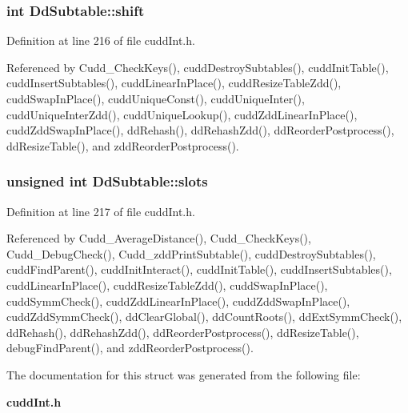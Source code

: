 \subsubsection{\setlength{\rightskip}{0pt plus 5cm}int \bf{Dd\-Subtable::shift}}\label{structDdSubtable_e89bb40a595ce1eda70d63fd78b23865}




Definition at line 216 of file cudd\-Int.h.

Referenced by Cudd\_\-Check\-Keys(), cudd\-Destroy\-Subtables(), cudd\-Init\-Table(), cudd\-Insert\-Subtables(), cudd\-Linear\-In\-Place(), cudd\-Resize\-Table\-Zdd(), cudd\-Swap\-In\-Place(), cudd\-Unique\-Const(), cudd\-Unique\-Inter(), cudd\-Unique\-Inter\-Zdd(), cudd\-Unique\-Lookup(), cudd\-Zdd\-Linear\-In\-Place(), cudd\-Zdd\-Swap\-In\-Place(), dd\-Rehash(), dd\-Rehash\-Zdd(), dd\-Reorder\-Postprocess(), dd\-Resize\-Table(), and zdd\-Reorder\-Postprocess().
\subsubsection{\setlength{\rightskip}{0pt plus 5cm}unsigned int \bf{Dd\-Subtable::slots}}\label{structDdSubtable_b01ae39304c9a7ce2236584a78ff5856}




Definition at line 217 of file cudd\-Int.h.

Referenced by Cudd\_\-Average\-Distance(), Cudd\_\-Check\-Keys(), Cudd\_\-Debug\-Check(), Cudd\_\-zdd\-Print\-Subtable(), cudd\-Destroy\-Subtables(), cudd\-Find\-Parent(), cudd\-Init\-Interact(), cudd\-Init\-Table(), cudd\-Insert\-Subtables(), cudd\-Linear\-In\-Place(), cudd\-Resize\-Table\-Zdd(), cudd\-Swap\-In\-Place(), cudd\-Symm\-Check(), cudd\-Zdd\-Linear\-In\-Place(), cudd\-Zdd\-Swap\-In\-Place(), cudd\-Zdd\-Symm\-Check(), dd\-Clear\-Global(), dd\-Count\-Roots(), dd\-Ext\-Symm\-Check(), dd\-Rehash(), dd\-Rehash\-Zdd(), dd\-Reorder\-Postprocess(), dd\-Resize\-Table(), debug\-Find\-Parent(), and zdd\-Reorder\-Postprocess().

The documentation for this struct was generated from the following file:\begin{CompactItemize}
\item 
\bf{cudd\-Int.h}\end{CompactItemize}
